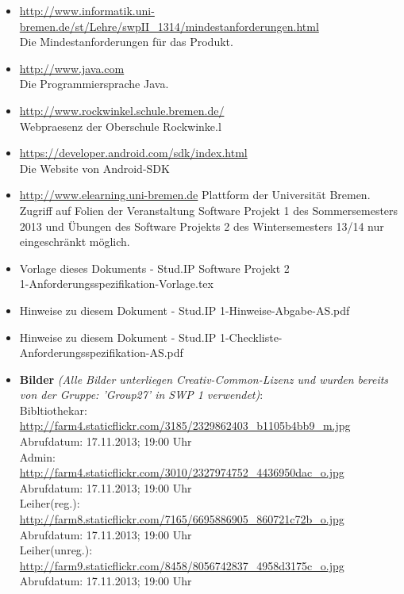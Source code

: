 \documentclass[fontsize=12pt,paper=a4,twoside]{scrartcl}
\begin{document}
\begin{itemize}

\item{\url{http://www.informatik.uni-bremen.de/st/Lehre/swpII_1314/mindestanforderungen.html}\\ Die Mindestanforderungen für das Produkt.}

\item{\url{http://www.java.com}\\ Die Programmiersprache Java.}

\item{\url{http://www.rockwinkel.schule.bremen.de/}\\ Webpraesenz der Oberschule Rockwinke.l}

 \item{\url{https://developer.android.com/sdk/index.html}\\ Die Website von Android-SDK}

\item{\url{http://www.elearning.uni-bremen.de} Plattform der Universität Bremen. Zugriff auf Folien der Veranstaltung Software Projekt 1 des Sommersemesters 2013 und Übungen des Software Projekts 2 des Wintersemesters 13/14 nur eingeschränkt möglich.}

\item{Vorlage dieses Dokuments - Stud.IP Software Projekt 2\\ 1-Anforderungsspezifikation-Vorlage.tex}

\item{Hinweise zu diesem Dokument - Stud.IP 1-Hinweise-Abgabe-AS.pdf}

\item{Hinweise zu diesem Dokument - Stud.IP 1-Checkliste-Anforderungsspezifikation-AS.pdf}

\item \textbf{Bilder} \textit{(Alle Bilder unterliegen Creativ-Common-Lizenz und wurden bereits von der Gruppe: 'Group27' in SWP 1 verwendet)}:\\
  Bibltiothekar:\\ \url{http://farm4.staticflickr.com/3185/2329862403_b1105b4bb9_m.jpg}\\
  Abrufdatum: 17.11.2013; 19:00 Uhr\\
  Admin:\\ \url{http://farm4.staticflickr.com/3010/2327974752_4436950dac_o.jpg}\\
    Abrufdatum: 17.11.2013; 19:00 Uhr\\
  Leiher(reg.):\\ \url{http://farm8.staticflickr.com/7165/6695886905_860721c72b_o.jpg}\\
    Abrufdatum: 17.11.2013; 19:00 Uhr\\
  Leiher(unreg.):\\ \url{http://farm9.staticflickr.com/8458/8056742837_4958d3175c_o.jpg}\\
    Abrufdatum: 17.11.2013; 19:00 Uhr\\
     \bigskip \\

\end{itemize}
\end{document}
